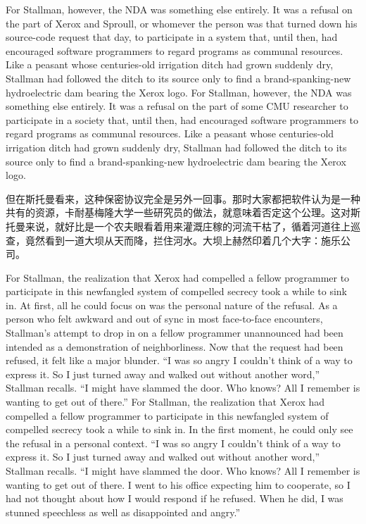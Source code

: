 \ifdefined\eng
\ifdefined\vone
For Stallman, however, the NDA was something else entirely. It was a refusal on the part of Xerox and Sproull, or whomever the person was that turned down his source-code request that day, to participate in a system that, until then, had encouraged software programmers to regard programs as communal resources. Like a peasant whose centuries-old irrigation ditch had grown suddenly dry, Stallman had followed the ditch to its source only to find a brand-spanking-new hydroelectric dam bearing the Xerox logo.
\fi
\ifdefined\vtwo
For Stallman, however, the NDA was something else entirely. It was a refusal on the part of some CMU researcher to participate in a society that, until then, had encouraged software programmers to regard programs as communal resources. Like a peasant whose centuries-old irrigation ditch had grown suddenly dry, Stallman had followed the ditch to its source only to find a brand-spanking-new hydroelectric dam bearing the Xerox logo.
\fi
\fi

\ifdefined\chs
但在斯托曼看来，这种保密协议完全是另外一回事。那时大家都把软件认为是一种共有的资源，卡耐基梅隆大学一些研究员的做法，就意味着否定这个公理。这对斯托曼来说，就好比是一个农夫眼看着用来灌溉庄稼的河流干枯了，循着河道往上巡查，竟然看到一道大坝从天而降，拦住河水。大坝上赫然印着几个大字：施乐公司。
\fi

\ifdefined\eng
\ifdefined\vone
For Stallman, the realization that Xerox had compelled a fellow programmer to participate in this newfangled system of compelled secrecy took a while to sink in. At first, all he could focus on was the personal nature of the refusal. As a person who felt awkward and out of sync in most face-to-face encounters, Stallman's attempt to drop in on a fellow programmer unannounced had been intended as a demonstration of neighborliness. Now that the request had been refused, it felt like a major blunder. ``I was so angry I couldn't think of a way to express it. So I just turned away and walked out without another word,'' Stallman recalls. ``I might have slammed the door. Who knows? All I remember is wanting to get out of there.''
\fi
\ifdefined\vtwo
For Stallman, the realization that Xerox had compelled a fellow programmer to participate in this newfangled system of compelled secrecy took a while to sink in. In the first moment, he could only see the refusal in a personal context. ``I was so angry I couldn't think of a way to express it. So I just turned away and walked out without another word,'' Stallman recalls. ``I might have slammed the door. Who knows? All I remember is wanting to get out of there. I went to his office expecting him to cooperate, so I had not thought about how I would respond if he refused. When he did, I was stunned speechless as well as disappointed and angry.''
\fi
\fi

